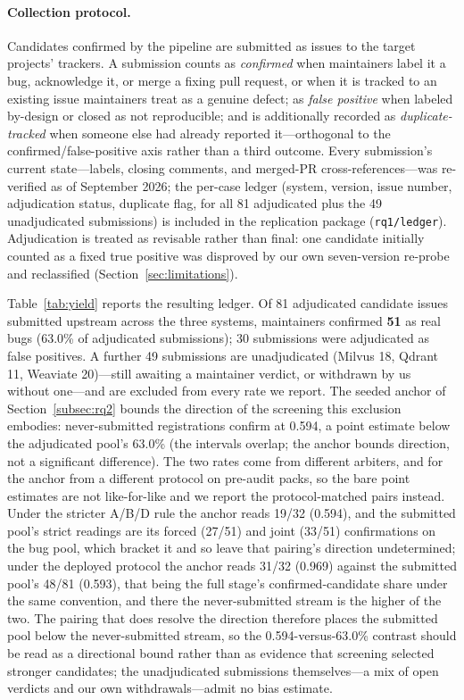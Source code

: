 \documentclass[acmsmall,screen,review,anonymous]{acmart}
\begin{document}
\paragraph{Collection protocol.}
Candidates confirmed by the pipeline are submitted as issues to the target projects' trackers. A submission counts as \emph{confirmed} when maintainers label it a bug, acknowledge it, or merge a fixing pull request, or when it is tracked to an existing issue maintainers treat as a genuine defect; as \emph{false positive} when labeled by-design or closed as not reproducible; and is additionally recorded as \emph{duplicate-tracked} when someone else had already reported it---orthogonal to the confirmed/false-positive axis rather than a third outcome. Every submission's current state---labels, closing comments, and merged-PR cross-references---was re-verified as of September 2026; the per-case ledger (system, version, issue number, adjudication status, duplicate flag, for all 81 adjudicated plus the 49 unadjudicated submissions) is included in the replication package (\texttt{rq1/ledger}). Adjudication is treated as revisable rather than final: one candidate initially counted as a fixed true positive was disproved by our own seven-version re-probe and reclassified (Section~\ref{sec:limitations}).

Table~\ref{tab:yield} reports the resulting ledger. Of 81 adjudicated candidate issues submitted upstream across the three systems, maintainers confirmed \textbf{51} as real bugs (63.0\% of adjudicated submissions); 30 submissions were adjudicated as false positives. A further 49 submissions are unadjudicated (Milvus 18, Qdrant 11, Weaviate 20)---still awaiting a maintainer verdict, or withdrawn by us without one---and are excluded from every rate we report. The seeded anchor of Section~\ref{subsec:rq2} bounds the direction of the screening this exclusion embodies: never-submitted registrations confirm at 0.594, a point estimate below the adjudicated pool's 63.0\% (the intervals overlap; the anchor bounds direction, not a significant difference). The two rates come from different arbiters, and for the anchor from a different protocol on pre-audit packs, so the bare point estimates are not like-for-like and we report the protocol-matched pairs instead. Under the stricter A/B/D rule the anchor reads 19/32 (0.594), and the submitted pool's strict readings are its forced (27/51) and joint (33/51) confirmations on the bug pool, which bracket it and so leave that pairing's direction undetermined; under the deployed protocol the anchor reads 31/32 (0.969) against the submitted pool's 48/81 (0.593), that being the full stage's confirmed-candidate share under the same convention, and there the never-submitted stream is the higher of the two. The pairing that does resolve the direction therefore places the submitted pool below the never-submitted stream, so the 0.594-versus-63.0\% contrast should be read as a directional bound rather than as evidence that screening selected stronger candidates; the unadjudicated submissions themselves---a mix of open verdicts and our own withdrawals---admit no bias estimate.
\end{document}
